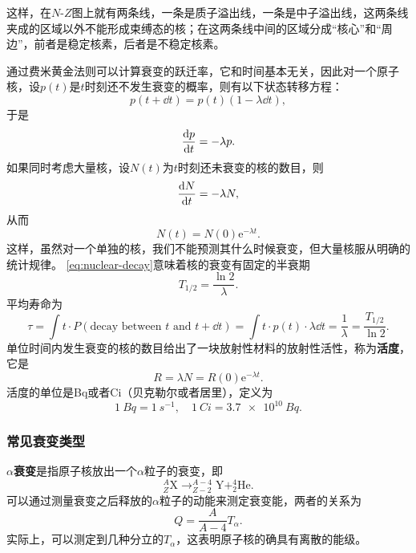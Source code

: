 \documentclass[UTF8, a4paper]{ctexart}
\newcommand*{\ee}{\mathrm{e}}
\newcommand*{\nuclear}[3]{^{#2}_{#3}\text{#1}}
\begin{document}
这样，在$N$-$Z$图上就有两条线，一条是质子溢出线，一条是中子溢出线，这两条线夹成的区域以外不能形成束缚态的核；在这两条线中间的区域分成“核心”和“周边”，前者是稳定核素，后者是不稳定核素。

通过费米黄金法则可以计算衰变的跃迁率，它和时间基本无关，因此对一个原子核，设$p(t)$是$t$时刻还不发生衰变的概率，则有以下状态转移方程：
\[
    p(t+\dd{t}) = p(t) (1 - \lambda \dd{t}),
\]
于是
\[
    \dv{p}{t} = - \lambda p.
\]
如果同时考虑大量核，设$N(t)$为$t$时刻还未衰变的核的数目，则
\[
    \dv{N}{t} = - \lambda N,
\]
从而
\begin{equation}
    N(t) = N(0) \ee^{- \lambda t}.
    \label{eq:nuclear-decay}
\end{equation}
这样，虽然对一个单独的核，我们不能预测其什么时候衰变，但大量核服从明确的统计规律。
\eqref{eq:nuclear-decay}意味着核的衰变有固定的半衰期
\begin{equation}
    T_{1/2} = \frac{\ln 2}{\lambda}.    
\end{equation}
平均寿命为
\begin{equation}
    \tau = \int t \cdot P(\text{decay between $t$ and $t+\dd{t}$}) = \int t \cdot p(t) \cdot \lambda \dd{t} = \frac{1}{\lambda} = \frac{T_{1/2}}{\ln 2}.
\end{equation}
单位时间内发生衰变的核的数目给出了一块放射性材料的放射性活性，称为\textbf{活度}，它是
\begin{equation}
    R = \lambda N = R(0) \ee^{-\lambda t}.
\end{equation}
活度的单位是\si{Bq}或者\si{Ci}（贝克勒尔或者居里），定义为
\[
    \SI{1}{Bq} = \SI{1}{s^{-1}}, \quad \SI{1}{Ci} = \SI{3.7e10}{Bq}.
\]

\subsubsection{常见衰变类型}

\textbf{$\alpha$衰变}是指原子核放出一个$\alpha$粒子的衰变，即
\[
    \nuclear{X}{A}{Z} \longrightarrow \nuclear{Y}{A-4}{Z-2} + \nuclear{He}{4}{2}.
\]
可以通过测量衰变之后释放的$\alpha$粒子的动能来测定衰变能，两者的关系为
\begin{equation}
    Q = \frac{A}{A-4} T_\alpha.
\end{equation}
实际上，可以测定到几种分立的$T_\alpha$，这表明原子核的确具有离散的能级。
\end{document}

